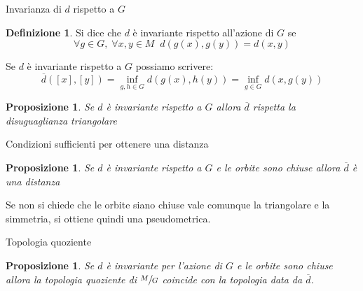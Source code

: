 \documentclass{beamer}
\newcounter{counter1}
\theoremstyle{plain}
\newtheorem{mypro}[counter1]{Proposizione}
\theoremstyle{definition}
\newtheorem{mydef}[counter1]{Definizione}
\theoremstyle{remark}
\newtheorem{myoss}[counter1]{Osservazione}
\newcommand{\obar}[1]{\overline{#1}}
\newcommand{\bra}[1]{\left[#1\right]}
\begin{document}
  

\begin{frame}{Invarianza di $d$ rispetto a $G$}
  \begin{mydef}
    Si dice che $d$ è invariante rispetto all'azione di $G$ se
    \[ \forall g \in G,\; \forall x,y \in M \;\; d(g(x),g(y)) = d(x,y) \]
  \end{mydef}
  Se $d$ è invariante rispetto a $G$ possiamo scrivere:
  \[ \obar d (\bra{x}, \bra{y}) = \inf _ {g,h \in G} d(g(x), h(y)) =
  \inf _{g \in G} d(x,g(y)) \]

  \begin{mypro}
    Se $d$ è invariante rispetto a $G$ allora $\obar d$ rispetta la
    disuguaglianza triangolare
  \end{mypro}
\end{frame}

\begin{frame}{Condizioni sufficienti per ottenere una distanza}
  \begin{mypro}
    Se $d$ è invariante rispetto a $G$ e le orbite sono chiuse allora
    $\obar d$ è una distanza
  \end{mypro}
  Se non si chiede che le orbite siano chiuse vale comunque la
  triangolare e la simmetria, si ottiene quindi una pseudometrica.
\end{frame}

\begin{frame}{Topologia quoziente}
  \begin{mypro}
    Se $d$ è invariante per l'azione di $G$ e le orbite sono chiuse
    allora la topologia quoziente di $\sfrac{M}{G}$ coincide con la
    topologia data da $\obar d$.
  \end{mypro}

\end{frame}
\end{document}
